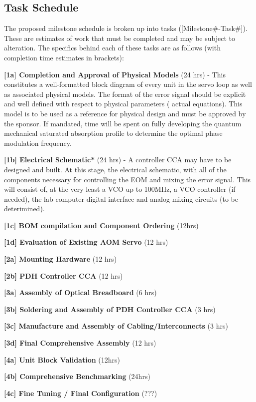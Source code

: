 \subsection{Task Schedule}  %

The proposed milestone schedule is broken up into tasks ([Milestone\#-Task\#]).
These are estimates of work that must be completed and may be subject to
alteration. The specifics behind each of these tasks are as follows (with
completion time estimates in brackets):

\begin{packed_itemize}
  \item{\textbf{[1a] Completion and Approval of Physical Models} (24 hrs)}
  - This constitutes a well-formatted block diagram of every unit in the servo
  loop as well as associated physical models. The format of the error signal
  should be explicit and well defined with respect to physical parameters (
  actual equations). This model is to be used as a reference for physical
  design and must be approved by the sponsor. If mandated, time will be spent on
  fully developing the quantum mechanical saturated absorption profile to
  determine the optimal phase modulation frequency.
  \item{\textbf{[1b] Electrical Schematic*} (24 hrs)}
  - A controller CCA may have to be designed and built. At this stage,
  the electrical schematic, with all of the components necessary for controlling
  the EOM and mixing the error signal. This will consist of, at the very least
  a VCO up to 100MHz, a VCO controller (if needed), the lab computer digital
  interface and analog mixing circuits (to be deterimined).
  \item{\textbf{[1c] BOM compilation and Component Ordering} (12hrs)}
  \item{\textbf{[1d] Evaluation of Existing AOM Servo} (12 hrs)}
  \item{\textbf{[2a] Mounting Hardware}} (12 hrs)
  \item{\textbf{[2b] PDH Controller CCA} (12 hrs)}
  \item{\textbf{[3a] Assembly of Optical Breadboard} (6 hrs)}
  \item{\textbf{[3b] Soldering and Assembly of PDH Controller CCA} (3 hrs)}
  \item{\textbf{[3c] Manufacture and Assembly of Cabling/Interconnects} (3 hrs)}
  \item{\textbf{[3d] Final Comprehensive Assembly} (12 hrs)}
  \item{\textbf{[4a] Unit Block Validation} (12hrs)}
  \item{\textbf{[4b] Comprehensive Benchmarking} (24hrs)}
  \item{\textbf{[4c] Fine Tuning / Final Configuration} (???)}
\end{packed_itemize}

